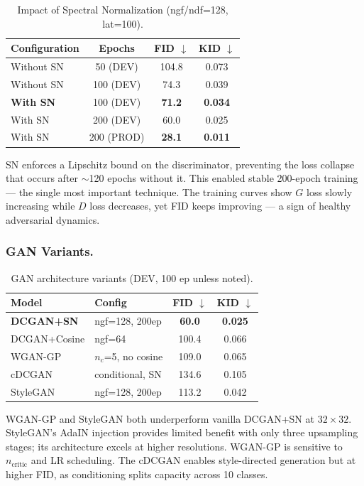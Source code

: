 \documentclass[runningheads]{llncs}
\begin{document}
\begin{table}[htbp]
\caption{Impact of Spectral Normalization (ngf/ndf=128, lat=100).}\label{tab:dcgan_sn}
\centering\small
\begin{tabular}{lccc}
\toprule
Configuration & Epochs & FID $\downarrow$ & KID $\downarrow$ \\
\midrule
Without SN & 50 (DEV) & 104.8 & 0.073 \\
Without SN & 100 (DEV) & 74.3 & 0.039 \\
\textbf{With SN} & 100 (DEV) & \textbf{71.2} & \textbf{0.034} \\
With SN & 200 (DEV) & 60.0 & 0.025 \\
With SN & 200 (PROD) & \textbf{28.1} & \textbf{0.011} \\
\bottomrule
\end{tabular}
\end{table}

SN enforces a Lipschitz bound on the discriminator, preventing the loss collapse that occurs after $\sim$120 epochs without it. This enabled stable 200-epoch training --- the single most important technique. The training curves show $G$ loss slowly increasing while $D$ loss decreases, yet FID keeps improving --- a sign of healthy adversarial dynamics.

\subsubsection{GAN Variants.}

\begin{table}[htbp]
\caption{GAN architecture variants (DEV, 100 ep unless noted).}\label{tab:gan_variants}
\centering\small
\begin{tabular}{llcc}
\toprule
Model & Config & FID $\downarrow$ & KID $\downarrow$ \\
\midrule
\textbf{DCGAN+SN} & ngf=128, 200ep & \textbf{60.0} & \textbf{0.025} \\
DCGAN+Cosine & ngf=64 & 100.4 & 0.066 \\
WGAN-GP & $n_c$=5, no cosine & 109.0 & 0.065 \\
cDCGAN & conditional, SN & 134.6 & 0.105 \\
StyleGAN & ngf=128, 200ep & 113.2 & 0.042 \\
\bottomrule
\end{tabular}
\end{table}

WGAN-GP and StyleGAN both underperform vanilla DCGAN+SN at $32\times 32$. StyleGAN's AdaIN injection provides limited benefit with only three upsampling stages; its architecture excels at higher resolutions. WGAN-GP is sensitive to $n_\text{critic}$ and LR scheduling. The cDCGAN enables style-directed generation but at higher FID, as conditioning splits capacity across 10 classes.
\end{document}
